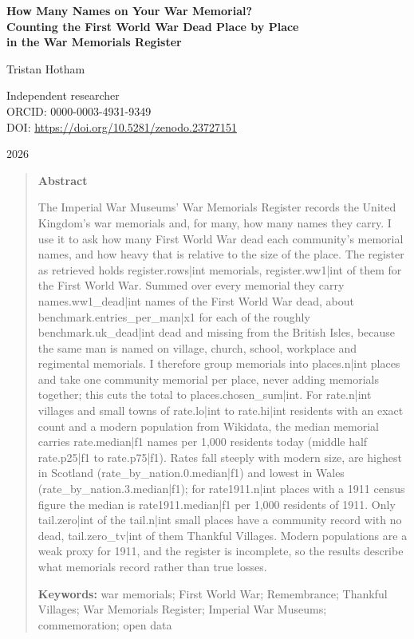 \documentclass[11pt,a4paper]{article}
\begin{document}
\begin{center}
{\Large\bfseries How Many Names on Your War Memorial?\\[2pt] Counting the First World War Dead Place by Place\\[2pt] in the War Memorials Register\par}
\vspace{1.2em}
{\large Tristan Hotham\par}
\vspace{0.3em}
{\small Independent researcher\\
ORCID: 0000-0003-4931-9349\\
DOI: \href{https://doi.org/10.5281/zenodo.23727151}{https://doi.org/10.5281/zenodo.23727151}\par}
\vspace{0.8em}
2026
\end{center}

\begin{quote}
\small
\begin{center}\textbf{Abstract}\end{center}
The Imperial War Museums' War Memorials Register records the United Kingdom's war memorials and, for many, how many names they carry. I use it to ask how many First World War dead each community's memorial names, and how heavy that is relative to the size of the place. The register as retrieved holds {{register.rows|int}} memorials, {{register.ww1|int}} of them for the First World War. Summed over every memorial they carry {{names.ww1_dead|int}} names of the First World War dead, about {{benchmark.entries_per_man|x1}} for each of the roughly {{benchmark.uk_dead|int}} dead and missing from the British Isles, because the same man is named on village, church, school, workplace and regimental memorials. I therefore group memorials into {{places.n|int}} places and take one community memorial per place, never adding memorials together; this cuts the total to {{places.chosen_sum|int}}. For {{rate.n|int}} villages and small towns of {{rate.lo|int}} to {{rate.hi|int}} residents with an exact count and a modern population from Wikidata, the median memorial carries {{rate.median|f1}} names per 1,000 residents today (middle half {{rate.p25|f1}} to {{rate.p75|f1}}). Rates fall steeply with modern size, are highest in Scotland ({{rate_by_nation.0.median|f1}}) and lowest in Wales ({{rate_by_nation.3.median|f1}}); for {{rate1911.n|int}} places with a 1911 census figure the median is {{rate1911.median|f1}} per 1,000 residents of 1911. Only {{tail.zero|int}} of the {{tail.n|int}} small places have a community record with no dead, {{tail.zero_tv|int}} of them Thankful Villages. Modern populations are a weak proxy for 1911, and the register is incomplete, so the results describe what memorials record rather than true losses.

\textbf{Keywords:} war memorials; First World War; Remembrance; Thankful Villages; War Memorials Register; Imperial War Museums; commemoration; open data
\end{quote}
\end{document}

